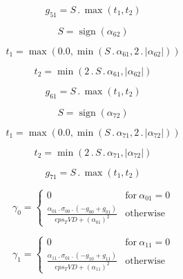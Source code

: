 \documentclass{article}
\begin{document}
\begin{dmath}g_{51} = S \,.\, \max\left(t_{1}, t_{2}\right)\end{dmath}

\begin{dmath}S = \operatorname{sign}{\left (\alpha_{62} \right )}\end{dmath}

\begin{dmath}t_{1} = \max\left(0.0, \min\left(S \,.\, \alpha_{61}, 2 \,.\, \left|{\alpha_{62}}\right|\right)\right)\end{dmath}

\begin{dmath}t_{2} = \min\left(2 \,.\, S \,.\, \alpha_{61}, \left|{\alpha_{62}}\right|\right)\end{dmath}

\begin{dmath}g_{61} = S \,.\, \max\left(t_{1}, t_{2}\right)\end{dmath}

\begin{dmath}S = \operatorname{sign}{\left (\alpha_{72} \right )}\end{dmath}

\begin{dmath}t_{1} = \max\left(0.0, \min\left(S \,.\, \alpha_{71}, 2 \,.\, \left|{\alpha_{72}}\right|\right)\right)\end{dmath}

\begin{dmath}t_{2} = \min\left(2 \,.\, S \,.\, \alpha_{71}, \left|{\alpha_{72}}\right|\right)\end{dmath}

\begin{dmath}g_{71} = S \,.\, \max\left(t_{1}, t_{2}\right)\end{dmath}

\begin{dmath}\gamma_{0} = \begin{cases} 0 & \text{for}\: \alpha_{01} = 0 \\\frac{\alpha_{01} \,.\, \sigma_{0 0} \,.\, \left(- g_{00} + g_{01}\right)}{eps_TVD + \left(\alpha_{01} \right)^{2}} & \text{otherwise} \end{cases}\end{dmath}

\begin{dmath}\gamma_{1} = \begin{cases} 0 & \text{for}\: \alpha_{11} = 0 \\\frac{\alpha_{11} \,.\, \sigma_{0 1} \,.\, \left(- g_{10} + g_{11}\right)}{eps_TVD + \left(\alpha_{11} \right)^{2}} & \text{otherwise} \end{cases}\end{dmath}
\end{document}
